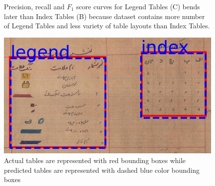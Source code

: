 \begin{figure}[h!]
\begin{subfigure}{0.325\linewidth}
    \caption{}
    \label{}
\end{subfigure}
\caption{Precision, recall and $F_1$ score curves for Legend Tables (C) bends later than Index Tables (B) because dataset contains more number of Legend Tables and less variety of table layouts than Index Tables.}
\label{fig:table_graph}
\end{figure}
\begin{figure}[!h]
  \centering
  \includegraphics[width=\linewidth,keepaspectratio]{massavi_405 -tables.jpg}
  \caption{Actual tables are represented with red bounding boxes while predicted tables are represented with dashed blue color bounding boxes}
  \label{fig:table_detection}
\end{figure}
